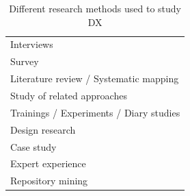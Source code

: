 \documentclass[english, 12pt, a4paper, sci, utf8, a-1b, online]{aaltothesis}
\begin{document}
\begin{table}[ht]
  \begin{center}
    \begin{tabular}{l}
      \hline
      Interviews                              \\
      Survey                                  \\
      Literature review / Systematic mapping  \\
      Study of related approaches             \\
      Trainings / Experiments / Diary studies \\
      Design research                         \\
      Case study                              \\
      Expert experience                       \\
      Repository mining                       \\
      \hline
    \end{tabular}
    \captionsetup{width=0.6\textwidth}
    \caption{Different research methods used to study DX}
    \label{table:research-methods}
  \end{center}
\end{table}
\end{document}
